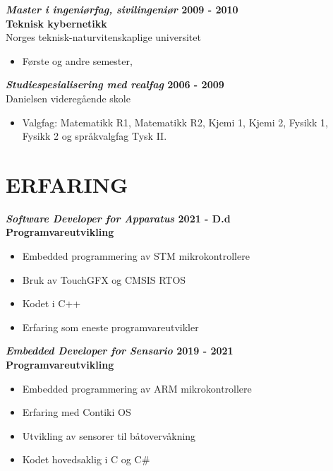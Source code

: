 \documentclass[margin, 10pt, norsk]{res} %
\begin{document}
\begin{resume}
\textbf{\emph{Master i ingeniørfag, sivilingeniør} \hfill 2009 - 2010
\\Teknisk kybernetikk } \\
Norges teknisk-naturvitenskaplige universitet
\begin{itemize} \itemsep -2pt %
\item Første og andre semester,
\end{itemize}

\textbf{\emph{Studiespesialisering med realfag }\hfill 2006 - 2009\\}
Danielsen videregående skole
\begin{itemize} \itemsep -2pt %
\item Valgfag: Matematikk R1, Matematikk R2, Kjemi 1, Kjemi 2, Fysikk 1,\\Fysikk 2 og språkvalgfag Tysk II.
\end{itemize}

\newpage

\hspace{5mm}  

\section{ERFARING}

\textbf{\emph{Software Developer for Apparatus} \hfill 2021 - D.d\\
	Programvareutvikling}

\begin{itemize} \itemsep -2pt %
	\item Embedded programmering av STM mikrokontrollere
	\item Bruk av TouchGFX og CMSIS RTOS
	\item Kodet i C++
	\item Erfaring som eneste programvareutvikler
\end{itemize}

\textbf{\emph{Embedded Developer for Sensario} \hfill 2019 - 2021\\
	Programvareutvikling}

\begin{itemize} \itemsep -2pt %
	\item Embedded programmering av ARM mikrokontrollere
	\item Erfaring med Contiki OS
	\item Utvikling av sensorer til båtovervåkning
	\item Kodet hovedsaklig i C og C#
\end{itemize}


\end{resume}
\end{document}
